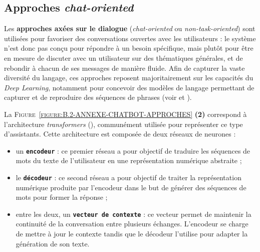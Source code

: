 		
		\subsection{Approches \textit{chat-oriented}}
		\label{annex:B.2.2-ANNEXE-CHATBOTS-APPROCHES-CHAT-ORIENTED}
			
			Les \textbf{approches axées sur le dialogue} (\textit{chat-oriented} ou \textit{non-task-oriented}) sont utilisées pour favoriser des conversations ouvertes avec les utilisateurs : le système n'est donc pas conçu pour répondre à un besoin spécifique, mais plutôt pour être en mesure de discuter avec un utilisateur sur des thématiques générales, et de rebondir à chacun de ses messages de manière fluide.
			Afin de capturer la vaste diversité du langage, ces approches reposent majoritairement sur les capacités du \textit{Deep Learning}, notamment pour concevoir des modèles de langage permettant de capturer et de reproduire des séquences de phrases (voir \cite{ni-etal:2022:recent-advances-deep} et \cite{kumar-etal:2016:ask-me-anything}).
			
			La \textsc{Figure~\ref{figure:B.2-ANNEXE-CHATBOT-APPROCHES}} \textbf{(2)} correspond à l'architecture \textit{transformers} (\cite{uszkoreit:2017:transformer-novel-neural}), communément utilisée pour représenter ce type d'assistants.
			Cette architecture est composée de deux réseaux de neurones :
			\begin{itemize}
				\item un \textcolor{colorCarrotOrange}{\textbf{\texttt{encodeur}}} :
					ce premier réseau a pour objectif de traduire les séquences de mots du texte de l'utilisateur en une représentation numérique abstraite ;
				\item le \textcolor{colorSilverLakeBlue}{\textbf{\texttt{décodeur}}} :
					ce second réseau a pour objectif de traiter la représentation numérique produite par l'encodeur dans le but de générer des séquences de mots pour former la réponse ;
				\item entre les deux, un \textcolor{colorDarkPastelGreen}{\textbf{\texttt{vecteur de contexte}}} :
					ce vecteur permet de maintenir la continuité de la conversation entre plusieurs échanges.
					L'encodeur se charge de mettre à jour le contexte tandis que le décodeur l'utilise pour adapter la génération de son texte.
			\end{itemize}
			
